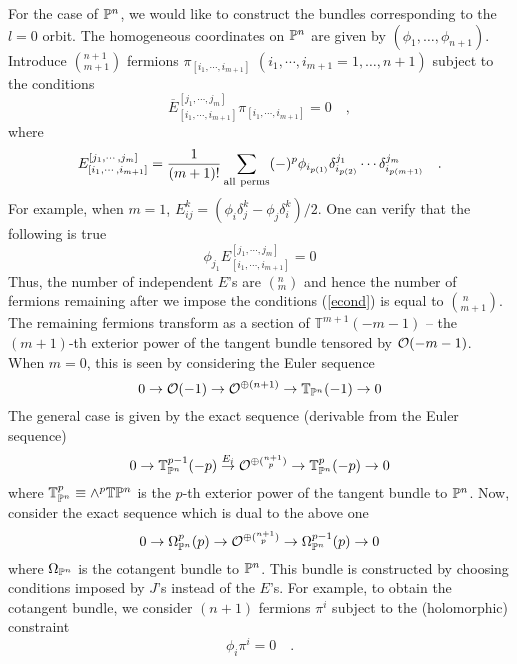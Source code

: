 \documentclass[a4paper,12pt]{article}
\def\Bbb{\mathbb}
\def\BT{\Bbb T}
\begin{document}
For the case of $\BP^n$, we would like to construct the bundles
corresponding to the $l=0$ orbit. The homogeneous coordinates on $\BP^n$
are given by $(\phi_1,\ldots,\phi_{n+1})$.
Introduce $\left( {}^{n+1}_{m+1}\right)$ fermions
$\pi_{[i_1,\cdots,i_{m+1}]}$ $(i_1,\cdots,i_{m+1}=1,\ldots,n+1)$
subject to the conditions
\begin{equation}
\overline{E}_{[i_1,\cdots,i_{m+1}]}^{[j_1,\cdots,j_m]}
\pi_{[i_1,\cdots,i_{m+1}]} =0\quad,
\label{econd}
\end{equation}
where 
$$
E_{[i_1,\cdots,i_{m+1}]}^{[j_1,\cdots,j_m]} = {1\over{(m+1)!}}
\sum_{\rm all\ perms} (-)^p
\phi_{i_{p(1)}} \delta_{i_{p(2)}}^{j_1}\cdots\delta_{i_{p(m+1)}}^{j_m}\quad.
$$
For example, when $m=1$,
$E_{ij}^k = (\phi_i \delta_j^k - \phi_j \delta_i^k)/2$.
One can verify that the following is true
$$
\phi_{j_1} E_{[i_1,\cdots,i_{m+1}]}^{[j_1,\cdots,j_m]} =0
$$
Thus, the number of independent $E$'s are $\left(
{}^{n}_{m}\right)$ and hence the number of fermions remaining after
we impose the conditions (\ref{econd}) is equal to
$\left({}^{~n}_{m+1}\right)$. 
The remaining fermions transform as a section of $\BT^{m+1}(-m-1)$ 
-- the $(m+1)$-th
exterior power of the tangent bundle tensored by ${\cal O}(-m-1)$. 
When $m=0$, this is seen by considering the Euler sequence
\begin{equation}
0\rightarrow {\cal O}(-1)\rightarrow {\cal O}^{\oplus (n+1)}\rightarrow
\BT_{\BP^n}(-1)\rightarrow 0
\label{euler}
\end{equation}
The general case is given by the exact sequence (derivable from the 
Euler sequence)
\begin{equation}
0\rightarrow \BT^{p-1}_{\BP^n}(-p)
\stackrel{E_i}{\rightarrow} {\cal O}^{\oplus ({}^{n+1}_{~p})}\rightarrow
\BT^p_{\BP^n}(-p)\rightarrow 0
\end{equation}
where $\BT^p_{\BP^n}\equiv\wedge^p \BT\BP^n$ is the $p$-th exterior power
of the tangent bundle to $\BP^n$. Now, consider the exact sequence 
which is dual to the above one
\begin{equation}
0\rightarrow \Omega^{p}_{\BP^n}(p)
\rightarrow {\cal O}^{\oplus ({}^{n+1}_{~p})}\rightarrow
\Omega^{p-1}_{\BP^n}(p)\rightarrow 0
\label{dualeuler}
\end{equation}
where $\Omega_{\BP^n}$ is the cotangent bundle to $\BP^n$. This bundle
is constructed by choosing conditions imposed by $J$'s instead of the
$E$'s. For example, to obtain the cotangent bundle, we consider $(n+1)$
fermions $\pi^i$ subject to the (holomorphic) constraint
$$
\phi_i \pi^i =0 \quad.
$$
\end{document}
